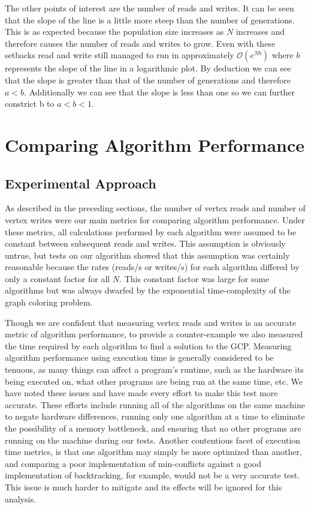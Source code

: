 \documentclass{article}
\begin{document}
	The other points of interest are the number of reads and writes. It can be seen that the slope of the line is a little more steep than the number of generations. This is as expected because the population size increases as $N$ increases and therefore causes the number of reads and writes to grow. Even with these setbacks read and write still managed to run in approximately  $\mathcal{O} (e^{Nb})$ where $b$ represents the slope of the line in a logarithmic plot. By deduction we can see that the slope is greater than that of the number of generations and therefore $a<b$. Additionally we can see that the slope is less than one so we can further constrict b to $a<b<1$. 
\section{Comparing Algorithm Performance}
	\label{comparisons}
	
	\subsection{Experimental Approach}
	
	As described in the preceding sections, the number of vertex reads and number of vertex writes were our main metrics for comparing algorithm performance. Under these metrics, all calculations performed by each algorithm were assumed to be constant between subsequent reads and writes. This assumption is obviously untrue, but tests on our algorithm showed that this assumption was certainly reasonable because the rates (reads/s or writes/s) for each algorithm differed by only a constant factor for all $N$. This constant factor was large for some algorithms but was always dwarfed by the exponential time-complexity of the graph coloring problem.
	
	Though we are confident that measuring vertex reads and writes is an accurate metric of algorithm performance, to provide a counter-example we also measured the time required by each algorithm to find a solution to the GCP. Measuring algorithm performance using execution time is generally considered to be tenuous, as many things can affect a program's runtime, such as the hardware its being executed on, what other programs are being run at the same time, etc. We have noted these issues and have made every effort to make this test more accurate. These efforts include running all of the algorithms on the same machine to negate hardware differences, running only one algorithm at a time to eliminate the possibility of a memory bottleneck, and ensuring that no other programs are running on the machine during our tests. Another contentious facet of execution time metrics, is that one algorithm may simply be more optimized than another, and comparing a poor implementation of min-conflicts against a good implementation of backtracking, for example, would not be a very accurate test. This issue is much harder to mitigate and its effects will be ignored for this analysis.
\end{document}
